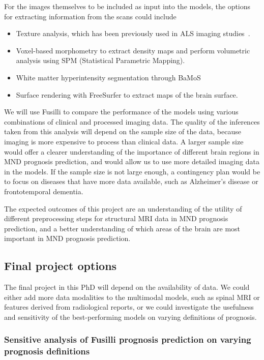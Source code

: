 For the images themselves to be included as input into the models, the options for extracting information from the scans could include
\begin{itemize}
\setlength\itemsep{-0.5em}
    \item Texture analysis, which has been previously used in ALS imaging studies~\cite{ishaqueEvaluatingCerebralCorrelates2018, johnsQuantifyingChangesSusceptibility2019}.
    \item Voxel-based morphometry to extract density maps and perform volumetric analysis using SPM (Statistical Parametric Mapping).
    \item White matter hyperintensity segmentation through BaMoS~\cite{fifordAutomatedWhiteMatter2020}
    \item Surface rendering with FreeSurfer to extract maps of the brain surface.
\end{itemize}


We will use Fusilli to compare the performance of the models using various combinations of clinical and processed imaging data.
The quality of the inferences taken from this analysis will depend on the sample size of the data, because imaging is more expensive to process than clinical data.
A larger sample size would offer a clearer understanding of the importance of different brain regions in MND prognosis prediction, and would allow us to use more detailed imaging data in the models.
If the sample size is not large enough, a contingency plan would be to focus on diseases that have more data available, such as Alzheimer's disease or frontotemporal dementia.

The expected outcomes of this project are an understanding of the utility of different preprocessing steps for structural MRI data in MND prognosis prediction, and a better understanding of which areas of the brain are most important in MND prognosis prediction.


\subsection{Final project options}

The final project in this PhD will depend on the availability of data.
We could either add more data modalities to the multimodal models, such as spinal MRI or features derived from radiological reports, or we could investigate the usefulness and sensitivity of the best-performing models on varying definitions of prognosis.

\subsubsection*{Sensitive analysis of Fusilli prognosis prediction on varying prognosis definitions}

